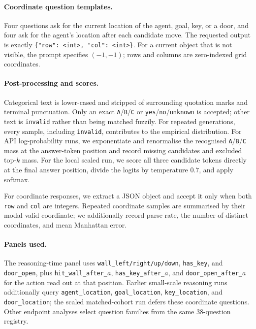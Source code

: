 \documentclass{article}
\begin{document}
\paragraph{Coordinate question templates.}
Four questions ask for the current location of the agent, goal, key, or a door, and four ask for the agent's location after each candidate move.
The requested output is exactly \texttt{\{"row": <int>, "col": <int>\}}.
For a current object that is not visible, the prompt specifies $(-1,-1)$; rows and columns are zero-indexed grid coordinates.

\paragraph{Post-processing and scores.}
Categorical text is lower-cased and stripped of surrounding quotation marks and terminal punctuation.
Only an exact \texttt{A}/\texttt{B}/\texttt{C} or \texttt{yes}/\texttt{no}/\texttt{unknown} is accepted; other text is \texttt{invalid} rather than being matched fuzzily.
For repeated generations, every sample, including \texttt{invalid}, contributes to the empirical distribution.
For API log-probability runs, we exponentiate and renormalise the recognised \texttt{A}/\texttt{B}/\texttt{C} mass at the answer-token position and record missing candidates and excluded top-$k$ mass.
For the local scaled run, we score all three candidate tokens directly at the final answer position, divide the logits by temperature $0.7$, and apply softmax.

For coordinate responses, we extract a JSON object and accept it only when both \texttt{row} and \texttt{col} are integers.
Repeated coordinate samples are summarised by their modal valid coordinate; we additionally record parse rate, the number of distinct coordinates, and mean Manhattan error.

\paragraph{Panels used.}
The reasoning-time panel uses \texttt{wall\_left/right/up/down}, \texttt{has\_key}, and \texttt{door\_open}, plus \texttt{hit\_wall\_after\_$a$}, \texttt{has\_key\_after\_$a$}, and \texttt{door\_open\_after\_$a$} for the action read out at that position.
Earlier small-scale reasoning runs additionally query \texttt{agent\_location}, \texttt{goal\_location}, \texttt{key\_location}, and \texttt{door\_location}; the scaled matched-cohort run defers these coordinate questions.
Other endpoint analyses select question families from the same 38-question registry.
\end{document}
